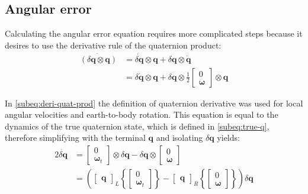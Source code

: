 \subsection{Angular error}

Calculating the angular error equation requires more complicated steps because it desires to use the derivative rule of the quaternion product:
\begin{subequations}
    \begin{align}
        \dot{(\delta\mathbf{q} \otimes \mathbf{q} )} &= \dot{\delta\mathbf{q}} \otimes \mathbf{q}+\delta\mathbf{q}\otimes\dot{\mathbf{q}} \\
        &=\delta\dot{\mathbf{q}}\otimes\mathbf{q} + \delta\mathbf{q} \otimes
        \frac{1}{2}\begin{bmatrix}
            0 \\ \boldsymbol{\omega}
        \end{bmatrix}\otimes\mathbf{q}
        \label{subeq:deri-quat-prod}
    \end{align}
\end{subequations}

In \eqref{subeq:deri-quat-prod} the definition of quaternion derivative was used for local angular velocities and earth-to-body rotation. This equation is equal to the dynamics of the true quaternion state, which is defined in \eqref{subeq:true-q}, therefore simplifying with the terminal $\mathbf{q}$ and isolating $\delta\mathbf{q}$ yields:
\begin{equation}
\begin{aligned}
    2\dot{\delta\mathbf{q}}&=\begin{bmatrix} 0 \\ \boldsymbol{\omega}_t \end{bmatrix}\otimes \delta\mathbf{q} -
    \delta\mathbf{q}\otimes \begin{bmatrix} 0 \\ \boldsymbol{\omega} \end{bmatrix} \\ &= 
    \left(\begin{bmatrix} \mathbf{q} \end{bmatrix}_L
    \left\{\begin{bmatrix} 0 \\ \boldsymbol{\omega}_t \end{bmatrix}\right\}-
    \begin{bmatrix} \mathbf{q} \end{bmatrix}_R
    \left\{\begin{bmatrix} 0 \\ \boldsymbol{\omega} \end{bmatrix}\right\}\right)\delta\mathbf{q}
\end{aligned}    
\end{equation}

